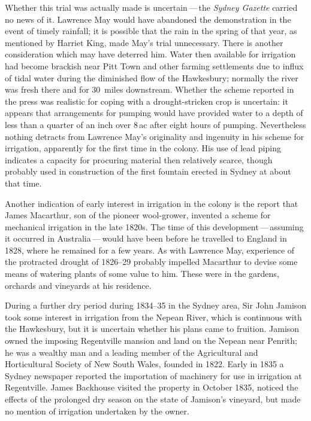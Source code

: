 Whether this trial was actually made is uncertain\,---\,the
\textsl{Sydney Gazette} carried no news of it.  Lawrence May would
have abandoned the demonstration in the event of timely rainfall; it
is possible that the rain in the spring of that year, as mentioned by
Harriet King, made May's trial unnecessary.  There is another
consideration which may have deterred him.  Water then available for
irrigation had become brackish near Pitt Town and other farming
settlements due to influx of tidal water during the diminished flow of
the Hawkesbury; normally the river was fresh there and for 30~miles
downstream.  Whether the
scheme reported in the press was realistic for coping with a
drought-stricken crop is uncertain: it appears that arrangements for
pumping would have provided water to a depth of less than a quarter of
an inch over 8\,ac after eight hours of pumping.  Nevertheless nothing
detracts from Lawrence May's originality and ingenuity in his scheme
for irrigation, apparently for the first time in the colony.  His use
of lead piping indicates a capacity for procuring material then
relatively scarce, though probably used in construction of the first
fountain erected in Sydney at about that time.

Another indication of early interest in irrigation in the colony is
the report that James Mac\-ar\-th\-ur, son of the
pioneer wool-grower, invented a scheme for mechanical irrigation in
the late 1820s.  The time of this development\,---\,assuming it occurred
in Australia\,---\,would have been before he travelled to England in
1828, where he remained for a few years.  As with Lawrence May,
experience of the protracted drought of 1826--29 probably impelled
Macarthur to devise some means of watering plants of some value to
him.  These were in the gardens, orchards and vineyards at his
residence.

During a further dry period during 1834--35 in the Sydney area, Sir
John Jamison took some interest in irrigation from
the Nepean River,  which is continuous with the
Hawkesbury, but it is uncertain whether his plans came to fruition.
Jamison owned the imposing Regentville  mansion and
land on the Nepean near Penrith;  he was a wealthy man
and a leading member of the Agricultural and Horticultural Society of
New South Wales, founded in 1822.  Early in 1835 a Sydney newspaper
reported the importation of machinery for use in irrigation at
Regentville.  James Backhouse  visited the
property in October 1835, noticed the effects of the prolonged dry
season on the state of Jamison's vineyard, but made no mention of
irrigation undertaken by the owner.


